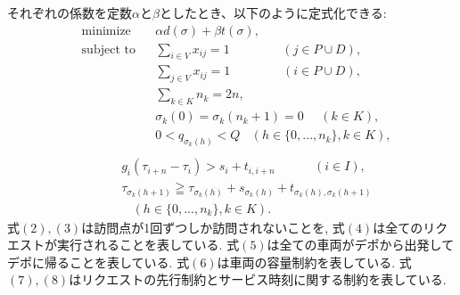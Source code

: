 それぞれの係数を定数$\alpha$と$\beta$としたとき、以下のように定式化できる:
\begin{align*}
  &\textrm{minimize}   &&
  \alpha d(\sigma)+ \beta t(\sigma),\tag{1}\\
  &\textrm{subject to} && \sum_{i \in V} x_{ij} = 1 \ \ \ \ \ \ \ \ \ \ \ \ \ \ \ \ \ \ \ (j \in  P \cup D), \tag{2}\\
  &                    && \sum_{j \in V} x_{ij} = 1 \ \ \ \ \ \ \ \ \ \ \ \ \ \ \ \ \ \ \ (i \in  P \cup D), \tag{3}\\
  &                    && \sum_{k \in K} n_k = 2n,\tag{4}\\
  &                    && \sigma_k(0) = \sigma_k(n_k+1) = 0 \ \ \ \ \ \ (k \in K),\tag{5}\\
  &                    && 0 < q_{\sigma_k(h)} < Q\ \ \ \
  (h \in \{0,...,n_k\},k \in K),\tag{6}\\
\end{align*}
\begin{align*}
  &                    && g_i(\tau_{i+n}-\tau_i) > s_i + t_{i,i+n}\ \ \ \ \ \ \ \ \ \ \ \ \ \  (i \in I),\tag{7}\\
  &                    && \tau_ {\sigma_k (h+1)} \geqq \tau_ {\sigma_k (h)} + s_{\sigma_k (h)} + t_ {\sigma_k (h),\sigma_k (h+1)}\\
  &                    &&  \ \ \ \ (h \in \{0,...,n_k\},k \in K).\tag{8}
\end{align*}
式$(2),(3)$は訪問点が1回ずつしか訪問されないことを, 式$(4)$は全てのリクエストが実行されることを表している. 式$(5)$は全ての車両がデポから出発してデポに帰ることを表している. 式$(6)$は車両の容量制約を表している. 式$(7),(8)$はリクエストの先行制約とサービス時刻に関する制約を表している.
